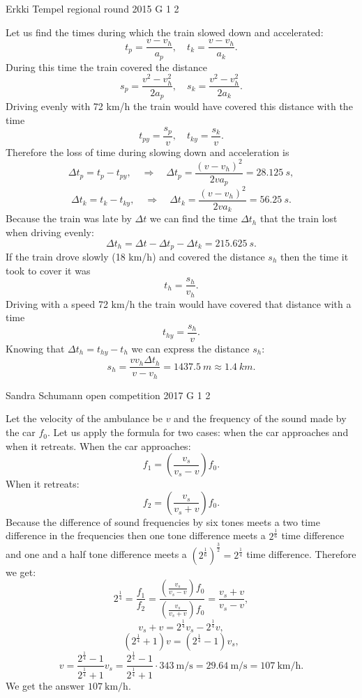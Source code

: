 \documentclass[11pt]{article}
\begin{document}
{Erkki Tempel} %
{regional round} %
{2015} %
{G 1} %
{2} %
{

\ifEngSolution
Let us find the times during which the train slowed down and accelerated:
\[ t_p = \frac{v - v_h}{a_p},\quad t_k = \frac{v-v_h}{a_k}. \]
During this time the train covered the distance
\[ s_p = \frac{v^2-v_h^2}{2a_p}, \quad s_k = \frac{v^2-v_h^2}{2a_k}. \]
Driving evenly with 72 km/h the train would have covered this distance with the time
\[ t_{py} = \frac{s_p}{v},\quad t_{ky} =\frac{s_k}{v}. \]
Therefore the loss of time during slowing down and acceleration is
\[ \Delta t_p =  t_{p} - t_{py}, \quad\Rightarrow\quad \Delta t_p = \frac{(v-v_h)^2}{2va_p}=\SI{28,125}{s},\]
\[ \Delta t_k =  t_{k} - t_{ky}, \quad\Rightarrow\quad \Delta t_k = \frac{(v-v_h)^2}{2va_k}=\SI{56,25}{s}.\]
Because the train was late by $\Delta t$ we can find the time $\Delta t_h$ that the train lost when driving evenly:
\[ \Delta t_h = \Delta t - \Delta t_p - \Delta t_k = \SI{215,625}{s}. \]
If the train drove slowly (18 km/h) and covered the distance $s_h$ then the time it took to cover it was
\[ t_h = \frac{s_h}{v_h}. \] 
Driving with a speed 72 km/h the train would have covered that distance with a time
\[ t_{hy} = \frac{s_h}{v}. \]
Knowing that $\Delta t_h = t_{hy} - t_h$ we can express the distance $s_h$:
\[ s_h = \frac{vv_h\Delta t_h}{v-v_h} = \SI{1437,5}{m} \approx \SI{1,4}{km}.\]
\fi
}

{Sandra Schumann} %
{open competition} %
{2017} %
{G 1} %
{2} %
{

\ifEngSolution
Let the velocity of the ambulance be $v$ and the frequency of the sound made by the car $f_0$. Let us apply the formula for two cases: when the car approaches and when it retreats. 
When the car approaches:
\[f_1 = \left(\frac{v_s}{v_s - v}\right)f_0.\]
When it retreats:
\[f_2 = \left(\frac{v_s}{v_s + v}\right)f_0.\]
Because the difference of sound frequencies by six tones meets a two time difference in the frequencies then one tone difference meets a $2^{\frac 1 6}$ time difference and one and a half tone difference meets a $\left(2^{\frac 1 6}\right)^{\frac 3 2} = 2^{\frac 1 4}$ time difference. Therefore we get:
\[2^{\frac 1 4} = \frac{f_1}{f_2} = \frac{(\frac{v_s}{v_s - v})f_0}{(\frac{v_s}{v_s + v})f_0} = \frac{v_s + v}{v_s - v},\]
\[v_s + v = 2^{\frac 1 4}v_s - 2^{\frac 1 4}v,\]
\[(2^{\frac 1 4} + 1)v = (2^{\frac 1 4} - 1)v_s,\]
\[v = \frac{2^{\frac 1 4} - 1}{2^{\frac 1 4} + 1}v_s = \frac{2^{\frac 1 4} - 1}{2^{\frac 1 4} + 1} \cdot \SI{343}{\meter\per\second} = \SI{29.64}{\meter\per\second} = \SI{107}{\kilo\meter\per\hour}. \]
We get the answer $\SI{107}{\kilo\meter\per\hour}$.
\fi
}
\end{document}
